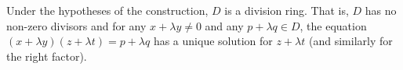 Under the hypotheses of the construction, $D$ is a division ring. That is, $D$ has no non-zero divisors and for any $x + \lambda y \neq 0$ and any $p + \lambda q \in D$, the equation $(x + \lambda y)(z + \lambda t) = p + \lambda q$ has a unique solution for $z + \lambda t$ (and similarly for the right factor).
